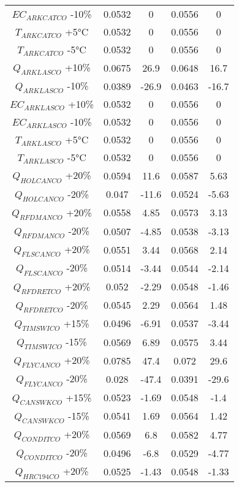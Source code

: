 \begin{spacing}{1.0}
\begin{center}
\begin{longtable}{ccccc}
			$EC_{ARKCATCO} $ -10\% & 0.0532 & 0 & 0.0556 & 0 \\
			$T_{ARKCATCO} $ +5\si{\degreeCelsius} & 0.0532 & 0 & 0.0556 & 0 \\
			$T_{ARKCATCO} $ -5\si{\degreeCelsius} & 0.0532 & 0 & 0.0556 & 0 \\
			$Q_{ARKLASCO} $ +10\% & 0.0675 & 26.9 & 0.0648 & 16.7 \\
			$Q_{ARKLASCO} $ -10\% & 0.0389 & -26.9 & 0.0463 & -16.7 \\
			$EC_{ARKLASCO} $ +10\% & 0.0532 & 0 & 0.0556 & 0 \\
			$EC_{ARKLASCO} $ -10\% & 0.0532 & 0 & 0.0556 & 0 \\
			$T_{ARKLASCO} $ +5\si{\degreeCelsius} & 0.0532 & 0 & 0.0556 & 0 \\
			$T_{ARKLASCO} $ -5\si{\degreeCelsius} & 0.0532 & 0 & 0.0556 & 0 \\
			$Q_{HOLCANCO} $ +20\% & 0.0594 & 11.6 & 0.0587 & 5.63 \\
			$Q_{HOLCANCO} $ -20\% & 0.047 & -11.6 & 0.0524 & -5.63 \\
			$Q_{RFDMANCO} $ +20\% & 0.0558 & 4.85 & 0.0573 & 3.13 \\
			$Q_{RFDMANCO} $ -20\% & 0.0507 & -4.85 & 0.0538 & -3.13 \\
			$Q_{FLSCANCO} $ +20\% & 0.0551 & 3.44 & 0.0568 & 2.14 \\
			$Q_{FLSCANCO} $ -20\% & 0.0514 & -3.44 & 0.0544 & -2.14 \\
			$Q_{RFDRETCO} $ +20\% & 0.052 & -2.29 & 0.0548 & -1.46 \\
			$Q_{RFDRETCO} $ -20\% & 0.0545 & 2.29 & 0.0564 & 1.48 \\
			$Q_{TIMSWICO} $ +15\% & 0.0496 & -6.91 & 0.0537 & -3.44 \\
			$Q_{TIMSWICO} $ -15\% & 0.0569 & 6.89 & 0.0575 & 3.44 \\
			$Q_{FLYCANCO} $ +20\% & 0.0785 & 47.4 & 0.072 & 29.6 \\
			$Q_{FLYCANCO} $ -20\% & 0.028 & -47.4 & 0.0391 & -29.6 \\
			$Q_{CANSWKCO} $ +15\% & 0.0523 & -1.69 & 0.0548 & -1.4 \\
			$Q_{CANSWKCO} $ -15\% & 0.0541 & 1.69 & 0.0564 & 1.42 \\
			$Q_{CONDITCO} $ +20\% & 0.0569 & 6.8 & 0.0582 & 4.77 \\
			$Q_{CONDITCO} $ -20\% & 0.0496 & -6.8 & 0.0529 & -4.77 \\
			$Q_{HRC194CO} $ +20\% & 0.0525 & -1.43 & 0.0548 & -1.33 \\

\end{longtable}
\end{center}
\end{spacing}
